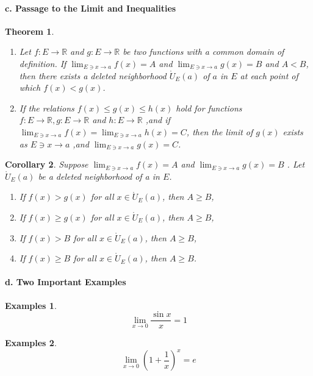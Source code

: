 \documentclass[a4paper,12pt]{article} %
\newtheorem{theorem}{Theorem}[section]
\newtheorem{corollary}[theorem]{Corollary}
\newtheorem{example}{Examples}
\begin{document}
\paragraph{{\rm \textbf{c. Passage to the Limit and Inequalities}}}
\begin{theorem}
    \begin{enumerate}
    \item
    Let $\displaystyle f: E \to \mathbb{R}$ and $g: E \to \mathbb{R}$
    be two functions with a common domain of definition.
    If $\displaystyle \lim_{E \ni x \to a}f(x) = A$  and 
       $\displaystyle \lim_{E \ni x \to a}g(x) = B$ and $A < B$,
    then there exists a deleted neighborhood $\displaystyle 
    \mathring{U}_E(a)$ of $a$ in $E$ at each point of which $f(x) < g(x)$.
    \item 
    If the relations $f(x) \le g(x) \le h(x)$ hold for functions 
    $f: E \to \mathbb{R}, g: E \to \mathbb{R}$ and $h: E \to \mathbb{R}$
    ,and if $\displaystyle \lim_{E \ni x \to a}f(x) = \lim_{E \ni x \to a}h(x) = C$,
    then the limit of $g(x)$ exists as $\displaystyle E \ni x \to a$ ,and 
            $\displaystyle \lim_{E \ni x \to a}g(x) = C$.
    \end{enumerate}
\end{theorem}

\begin{corollary}
    Suppose $\displaystyle \lim_{E \ni x \to a}f(x) = A$  and 
       $\displaystyle \lim_{E \ni x \to a}g(x) = B$ .
       Let $\displaystyle \mathring{U}_E(a)$ be a deleted neighborhood of 
       a in $E$.
       \begin{enumerate}
           \item If $f(x) > g(x)$ for all $\displaystyle x \in \mathring{U}_E(a)$,
            then $A \ge B$,
           \item If $f(x) \ge g(x)$ for all $\displaystyle x \in \mathring{U}_E(a)$,
            then $A \ge B$,
           \item If $f(x) > B$ for all $\displaystyle x \in \mathring{U}_E(a)$,
            then $A \ge B$,
           \item If $f(x) \ge B$ for all $\displaystyle x \in \mathring{U}_E(a)$,
            then $A \ge B$.
       \end{enumerate}
\end{corollary}

\paragraph{{\rm \textbf{d. Two Important Examples}}}
\begin{example}
    \[
        \lim_{x \to 0}\frac{\sin x}{x} = 1
        \]
\end{example}
\begin{example}
    \[
        \lim_{x \to 0}\left(1+\frac{1}{x}\right)^x = e
        \]
\end{example}
\end{document}
